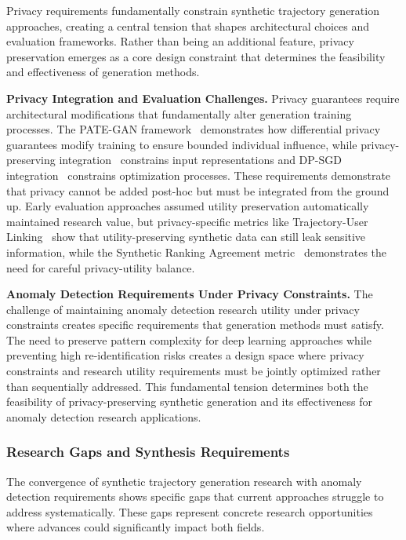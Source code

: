 \documentclass[runningheads]{llncs}
\begin{document}
Privacy requirements fundamentally constrain synthetic trajectory generation approaches, creating a central tension that shapes architectural choices and evaluation frameworks. Rather than being an additional feature, privacy preservation emerges as a core design constraint that determines the feasibility and effectiveness of generation methods.

\textbf{Privacy Integration and Evaluation Challenges.} Privacy guarantees require architectural modifications that fundamentally alter generation training processes. The PATE-GAN framework~\cite{jordon2019pate} demonstrates how differential privacy guarantees modify training to ensure bounded individual influence, while privacy-preserving integration~\cite{rao2023cats} constrains input representations and DP-SGD integration~\cite{merhi2024synthetic} constrains optimization processes. These requirements demonstrate that privacy cannot be added post-hoc but must be integrated from the ground up. Early evaluation approaches assumed utility preservation automatically maintained research value, but privacy-specific metrics like Trajectory-User Linking~\cite{rao2023cats} show that utility-preserving synthetic data can still leak sensitive information, while the Synthetic Ranking Agreement metric~\cite{jordon2019pate} demonstrates the need for careful privacy-utility balance.

\textbf{Anomaly Detection Requirements Under Privacy Constraints.} The challenge of maintaining anomaly detection research utility under privacy constraints creates specific requirements that generation methods must satisfy. The need to preserve pattern complexity for deep learning approaches while preventing high re-identification risks creates a design space where privacy constraints and research utility requirements must be jointly optimized rather than sequentially addressed. This fundamental tension determines both the feasibility of privacy-preserving synthetic generation and its effectiveness for anomaly detection research applications.

\subsubsection{Research Gaps and Synthesis Requirements}

The convergence of synthetic trajectory generation research with anomaly detection requirements shows specific gaps that current approaches struggle to address systematically. These gaps represent concrete research opportunities where advances could significantly impact both fields.
\end{document}

